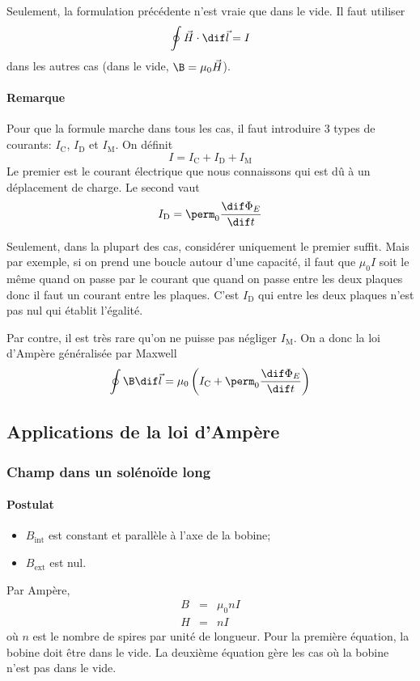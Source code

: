 Seulement, la formulation précédente n'est vraie que dans le vide.
Il faut utiliser
\[ \oint \vec H \cdot \dif \vec l = I \]
dans les autres cas (dans le vide, $\B = \mu_0 \vec H$).

\paragraph{Remarque}
Pour que la formule marche dans tous les cas, il faut introduire 3 types de courants:
$I_\mathrm{C}$, $I_\mathrm{D}$ et $I_\mathrm{M}$.
On définit
\[ I = I_\mathrm{C} + I_\mathrm{D} + I_\mathrm{M} \]
Le premier est le courant électrique que nous connaissons qui est dû à un déplacement de charge.
Le second vaut
\[ I_\mathrm{D} = \perm_0\frac{\dif \Phi_E}{\dif t} \]

Seulement, dans la plupart des cas, considérer uniquement le premier suffit.
Mais par exemple, si on prend une boucle autour d'une capacité,
il faut que $\mu_0I$ soit le même quand on passe par le courant que quand on passe entre les deux plaques donc il faut un courant entre les plaques.
C'est $I_\mathrm{D}$ qui entre les deux plaques n'est pas nul qui établit l'égalité.

Par contre, il est très rare qu'on ne puisse pas négliger $I_\mathrm{M}$.
On a donc la loi d'Ampère généralisée par Maxwell
\[ \oint \B \dif \vec l = \mu_0 \left(I_\mathrm{C} + \perm_0 \frac{\dif \Phi_E}{\dif t}\right) \]

\subsection{Applications de la loi d'Ampère}
\subsubsection{Champ dans un solénoïde long}
\label{sec:bbl}
\paragraph{Postulat}
\begin{itemize}
	\item $B_\mathrm{int}$ est constant et parallèle à l'axe de la bobine;
	\item $B_\mathrm{ext}$ est nul.
\end{itemize}
Par Ampère,
\begin{eqnarray*}
	B &=& \mu_0nI\\
	H &=& nI
\end{eqnarray*}
où $n$ est le nombre de spires par unité de longueur.
Pour la première équation, la bobine doit être dans le vide.
La deuxième équation gère les cas où la bobine n'est pas dans le vide.

